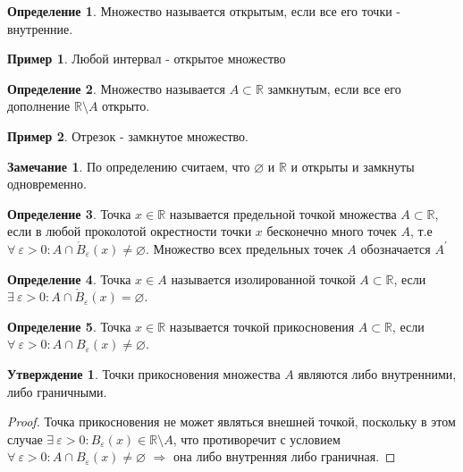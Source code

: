 \documentclass[a4paper, 12pt]{article}
\newcommand{\R}{\mathbb{R}}
\renewcommand{\epsilon}{\varepsilon}
\renewcommand{\emptyset}{\varnothing}
\theoremstyle{definition}
\newtheorem*{definition}{Определение}
\newtheorem*{comm}{Замечание}
\newtheorem*{statement}{Утверждение}
\newtheorem*{example}{Пример}
\begin{document}
        \begin{definition}
            Множество называется открытым, если все его точки - внутренние.
        \end{definition}
        \begin{example}
            Любой интервал - открытое множество
        \end{example}
        \begin{definition}
            Множество называется $A\subset \R$ замкнутым, если все его дополнение $\R\setminus A$ открыто.
        \end{definition} 
        \begin{example}
            Отрезок - замкнутое множество.
        \end{example}
        \begin{comm}
            По определению считаем, что $\emptyset$ и $\R$ и открыты и замкнуты одновременно.
        \end{comm} 
        \begin{definition}
            Точка $x\in \R$ называется предельной точкой множества $A\subset \R$, если в любой проколотой окрестности точки $x$ бесконечно много точек $A$, т.е\\
            $\forall\ \epsilon >0: A\cap \mathring{B}_{\epsilon}(x)\ne\emptyset$. Множество всех предельных точек $A$ обозначается $A^{\prime}$
        \end{definition} 
        \begin{definition}
            Точка $x\in A$ называется изолированной точкой $A\subset \R$, если $\exists \ \epsilon>0: A\cap \mathring{B}_{\epsilon}(x)=\emptyset$.
        \end{definition} 
        \begin{definition}
            Точка $x\in \R$ называется точкой прикосновения $A\subset \R$, если $\forall \ \epsilon>0: A\cap {B}_{\epsilon}(x)\ne\emptyset$.
        \end{definition} 
        \begin{statement}
            Точки прикосновения множества $A$ являются либо внутренними, либо граничными.
        \end{statement}
        \begin{proof}
            Точка прикосновения не может являться внешней точкой, поскольку в этом случае $\exists\ \epsilon>0: B_{\epsilon}(x)\in \R\setminus A$, что противоречит с условием $\forall \ \epsilon>0: A\cap {B}_{\epsilon}(x)\ne\emptyset$
            $\Rightarrow$ она либо внутренняя либо граничная.
        \end{proof}
\end{document}
